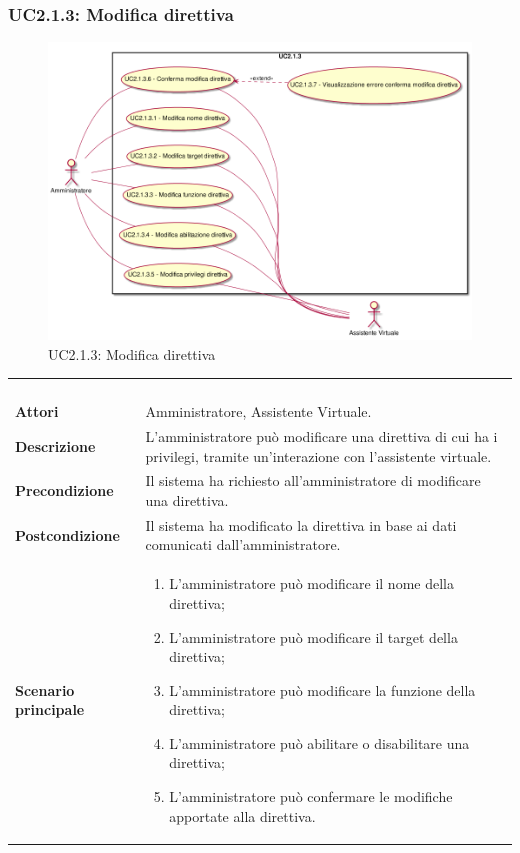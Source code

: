 \newpage\subsubsection{UC2.1.3: Modifica direttiva}
\label{UC2.1.3}
\begin{figure}[h]
\centering
\includegraphics[width=\textwidth,height=\textheight,keepaspectratio]{images/UseCaseUC213.png}
\caption{UC2.1.3: Modifica direttiva}
\end{figure}
\begin{longtable}{l|p{10cm}}
\rowcolor[gray]{0.8} \multicolumn{2}{c}{} \\
\rowcolor[gray]{0.8} \multicolumn{2}{c}{\textbf{UC2.1.3 - Modifica direttiva}} \\
\rowcolor[gray]{0.8} \multicolumn{2}{c}{} \\
\hline
&\\
\textbf{Attori} & Amministratore, Assistente Virtuale.\\[7pt]
\textbf{Descrizione} & L'amministratore può modificare una direttiva di cui ha i privilegi, tramite un'interazione con l'assistente virtuale.\\[7pt]
\textbf{Precondizione} & Il sistema ha richiesto all'amministratore di modificare una direttiva.\\[7pt]
\textbf{Postcondizione} & Il sistema ha modificato la direttiva in base ai dati comunicati dall'amministratore.\\[7pt]
\textbf{Scenario principale} &\begin{enumerate}
\item  L'amministratore può modificare il nome della direttiva;
\item  L'amministratore può modificare il target della direttiva;
\item  L'amministratore può modificare la funzione della direttiva;
\item  L'amministratore può abilitare o disabilitare una direttiva;
\item  L'amministratore può confermare le modifiche apportate alla direttiva.
\end{enumerate}
\\[7pt]\hline
\end{longtable}

